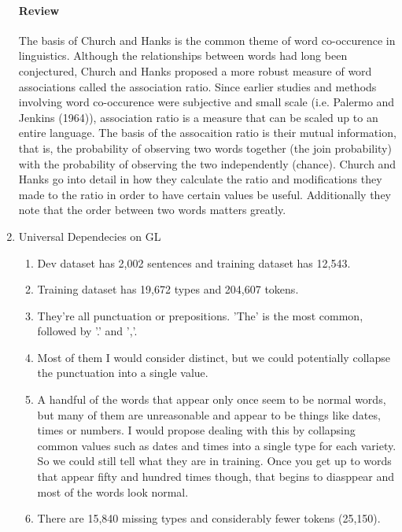 \documentclass[12pt]{article}
\begin{document}
\begin{enumerate}
\paragraph{Review} The basis of Church and Hanks is the common theme of word co-occurence
        in linguistics. Although the relationships between words had long been conjectured,
        Church and Hanks proposed a more robust measure of word associations called the 
        association ratio. Since earlier studies and methods involving word co-occurence 
        were subjective and small scale (i.e. Palermo and Jenkins (1964)), association
        ratio is a measure that can be scaled up to an entire language. The basis of the
        assocaition ratio is their mutual information, that is, the probability of observing
        two words together (the join probability) with the probability of observing the two
        independently (chance). Church and Hanks go into detail in how they calculate the
        ratio and modifications they made to the ratio in order to have certain values be
        useful. Additionally they note that the order between two words matters greatly.

\item Universal Dependecies on GL
  \begin{enumerate}
    \item Dev dataset has 2,002 sentences and training dataset has 12,543.
    \item Training dataset has 19,672 types and 204,607 tokens.
    \item They're all punctuation or prepositions. 'The' is the most common, followed 
          by '.' and ','.
    \item Most of them I would consider distinct, but we could potentially collapse 
          the punctuation into a single value.
    \item A handful of the words that appear only once seem to be normal words, but many
          of them are unreasonable and appear to be things like dates, times or numbers.
          I would propose dealing with this by collapsing common values such as dates and
          times into a single type for each variety. So we could still tell what they 
          are in training. Once you get up to words that appear fifty and hundred times
          though, that begins to diasppear and most of the words look normal.
    \item There are 15,840 missing types and considerably fewer tokens (25,150).
  \end{enumerate}

\end{enumerate}
\end{document}

